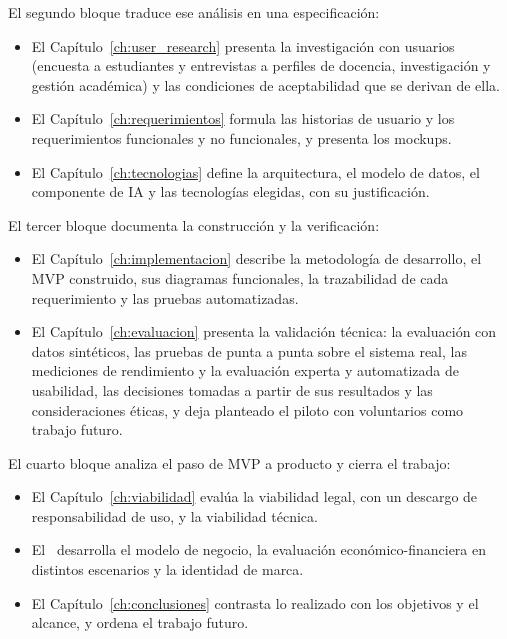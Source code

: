 El segundo bloque traduce ese análisis en una especificación:

\begin{itemize}
    \item El Capítulo~\ref{ch:user_research} presenta la investigación con usuarios (encuesta a estudiantes y entrevistas a perfiles de docencia, investigación y gestión académica) y las condiciones de aceptabilidad que se derivan de ella.
    \item El Capítulo~\ref{ch:requerimientos} formula las historias de usuario y los requerimientos funcionales y no funcionales, y presenta los mockups.
    \item El Capítulo~\ref{ch:tecnologias} define la arquitectura, el modelo de datos, el componente de IA y las tecnologías elegidas, con su justificación.
\end{itemize}

El tercer bloque documenta la construcción y la verificación:

\begin{itemize}
    \item El Capítulo~\ref{ch:implementacion} describe la metodología de desarrollo, el MVP construido, sus diagramas funcionales, la trazabilidad de cada requerimiento y las pruebas automatizadas.
    \item El Capítulo~\ref{ch:evaluacion} presenta la validación técnica: la evaluación con datos sintéticos, las pruebas de punta a punta sobre el sistema real, las mediciones de rendimiento y la evaluación experta y automatizada de usabilidad, las decisiones tomadas a partir de sus resultados y las consideraciones éticas, y deja planteado el piloto con voluntarios como trabajo futuro.
\end{itemize}

El cuarto bloque analiza el paso de MVP a producto y cierra el trabajo:

\begin{itemize}
    \item El Capítulo~\ref{ch:viabilidad} evalúa la viabilidad legal, con un descargo de responsabilidad de uso, y la viabilidad técnica.
    \item El \ desarrolla el modelo de negocio, la evaluación económico-financiera en distintos escenarios y la identidad de marca.
    \item El Capítulo~\ref{ch:conclusiones} contrasta lo realizado con los objetivos y el alcance, y ordena el trabajo futuro.
\end{itemize}

